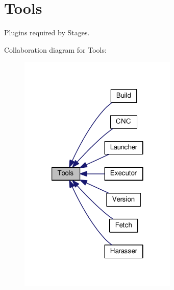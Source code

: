 \hypertarget{group___tools}{\section{Tools}
\label{group___tools}
}


Plugins required by Stages.  


Collaboration diagram for Tools\-:
\nopagebreak
\begin{figure}[H]
\begin{center}
\leavevmode
\includegraphics[width=214pt]{group___tools}
\end{center}
\end{figure}
